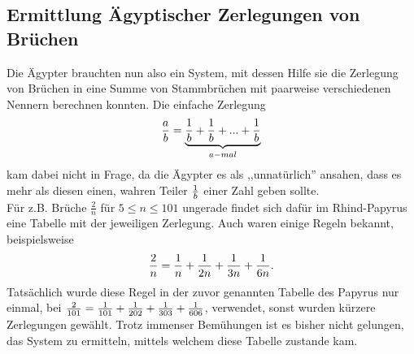 \subsection{Ermittlung Ägyptischer Zerlegungen von Brüchen}
Die Ägypter brauchten nun also ein System, mit dessen Hilfe sie die Zerlegung von Brüchen in eine Summe von Stammbrüchen mit paarweise verschiedenen Nennern berechnen konnten. Die einfache Zerlegung
$$\frac{a}{b} = \underbrace{\frac{1}{b} + \frac{1}{b} + ... +\frac{1}{b}}_{a-mal}$$
kam dabei nicht in Frage, da die Ägypter es als ,,unnatürlich'' ansahen, dass es mehr als diesen einen, wahren Teiler $\frac{1}{b}$ einer Zahl geben sollte. \cite[S.39]{Burton2011}\\
Für z.B. Brüche $\frac{2}{n}$ für $5 \leq n \leq 101$ ungerade findet sich dafür im Rhind-Papyrus eine Tabelle mit der jeweiligen Zerlegung. Auch waren einige Regeln bekannt, beispielsweise
$$\frac{2}{n} = \frac{1}{n} + \frac{1}{2n} + \frac{1}{3n} +\frac{1}{6n}.$$
Tatsächlich wurde diese Regel in der zuvor genannten Tabelle des Papyrus nur einmal, bei $\frac{2}{101} = \frac{1}{101}+\frac{1}{202}+\frac{1}{303}+\frac{1}{606}$, verwendet, sonst wurden kürzere Zerlegungen gewählt. Trotz immenser Bemühungen ist es bisher nicht gelungen, das System zu ermitteln, mittels welchem diese Tabelle zustande kam. \cite[S. 41]{Burton2011}